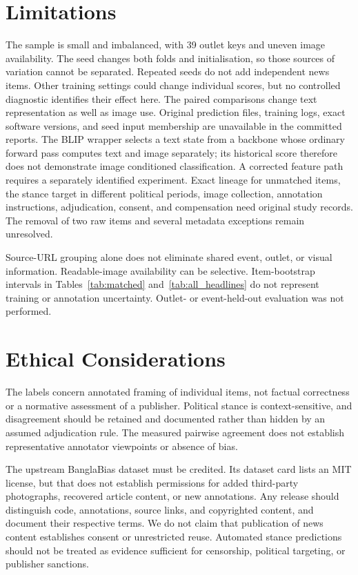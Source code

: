 \documentclass[11pt]{article}
\begin{document}
\section*{Limitations}
The sample is small and imbalanced, with 39 outlet keys and uneven image availability. The seed changes both folds and initialisation, so those sources of variation cannot be separated. Repeated seeds do not add independent news items. Other training settings could change individual scores, but no controlled diagnostic identifies their effect here. The paired comparisons change text representation as well as image use. Original prediction files, training logs, exact software versions, and seed input membership are unavailable in the committed reports. The BLIP wrapper selects a text state from a backbone whose ordinary forward pass computes text and image separately; its historical score therefore does not demonstrate image conditioned classification. A corrected feature path requires a separately identified experiment. Exact lineage for unmatched items, the stance target in different political periods, image collection, annotation instructions, adjudication, consent, and compensation need original study records. The removal of two raw items and several metadata exceptions remain unresolved. %

Source-URL grouping alone does not eliminate shared event, outlet, or visual information. Readable-image availability can be selective. Item-bootstrap intervals in Tables~\ref{tab:matched} and~\ref{tab:all_headlines} do not represent training or annotation uncertainty. Outlet- or event-held-out evaluation was not performed.

\section*{Ethical Considerations}
The labels concern annotated framing of individual items, not factual correctness or a normative assessment of a publisher. Political stance is context-sensitive, and disagreement should be retained and documented rather than hidden by an assumed adjudication rule. The measured pairwise agreement does not establish representative annotator viewpoints or absence of bias.

The upstream BanglaBias dataset must be credited. Its dataset card lists an MIT license, but that does not establish permissions for added third-party photographs, recovered article content, or new annotations. Any release should distinguish code, annotations, source links, and copyrighted content, and document their respective terms. We do not claim that publication of news content establishes consent or unrestricted reuse. Automated stance predictions should not be treated as evidence sufficient for censorship, political targeting, or publisher sanctions.
\end{document}
